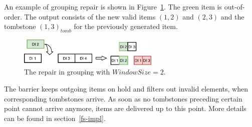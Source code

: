 An example of grouping repair is shown in Figure~\ref{grouping-replaying}. The green item is out-of-order. The output consists of the new valid items  $(1, 2)$ and $(2, 3)$  and the tombstone $(1, 3)_{tomb}$ for the previously generated item.

\begin{figure}[ht]
  \centering
  \includegraphics[width=0.6\textwidth]{pics/grouping-replaying}
  \caption{The repair in grouping with $WindowSize = 2$.}
  \label {grouping-replaying}
\end{figure}

The barrier  keeps outgoing items on hold and filters out invalid elements, when corresponding tombstones arrive. As soon as no tombstones preceding certain point cannot arrive anymore, items are delivered  up to this point. More details can be found  in section~\ref{fs-impl}.
